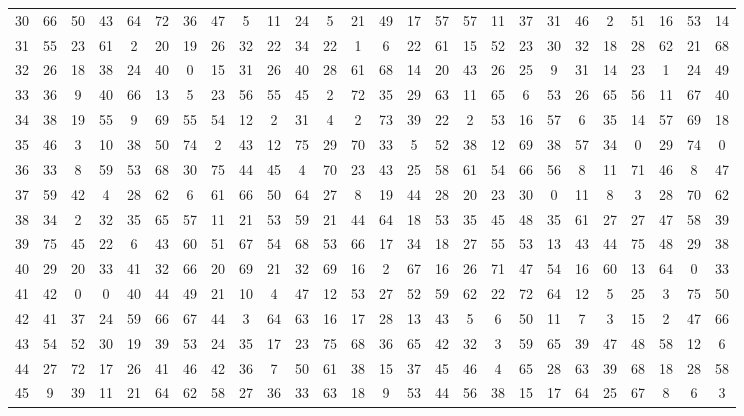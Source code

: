 \begin{table}
\begin{tabular}{c c c c c c c c c c c c c c c c c c c c c c c c c c }
30 & 66 & 50 & 43 & 64 & 72 & 36 & 47 & 5 & 11 & 24 & 5 & 21 & 49 & 17 & 57 & 57 & 11 & 37 & 31 & 46 & 2 & 51 & 16 & 53 & 14 \\
31 & 55 & 23 & 61 & 2 & 20 & 19 & 26 & 32 & 22 & 34 & 22 & 1 & 6 & 22 & 61 & 15 & 52 & 23 & 30 & 32 & 18 & 28 & 62 & 21 & 68 \\
32 & 26 & 18 & 38 & 24 & 40 & 0 & 15 & 31 & 26 & 40 & 28 & 61 & 68 & 14 & 20 & 43 & 26 & 25 & 9 & 31 & 14 & 23 & 1 & 24 & 49 \\
33 & 36 & 9 & 40 & 66 & 13 & 5 & 23 & 56 & 55 & 45 & 2 & 72 & 35 & 29 & 63 & 11 & 65 & 6 & 53 & 26 & 65 & 56 & 11 & 67 & 40 \\
34 & 38 & 19 & 55 & 9 & 69 & 55 & 54 & 12 & 2 & 31 & 4 & 2 & 73 & 39 & 22 & 2 & 53 & 16 & 57 & 6 & 35 & 14 & 57 & 69 & 18 \\
35 & 46 & 3 & 10 & 38 & 50 & 74 & 2 & 43 & 12 & 75 & 29 & 70 & 33 & 5 & 52 & 38 & 12 & 69 & 38 & 57 & 34 & 0 & 29 & 74 & 0 \\
36 & 33 & 8 & 59 & 53 & 68 & 30 & 75 & 44 & 45 & 4 & 70 & 23 & 43 & 25 & 58 & 61 & 54 & 66 & 56 & 8 & 11 & 71 & 46 & 8 & 47 \\
37 & 59 & 42 & 4 & 28 & 62 & 6 & 61 & 66 & 50 & 64 & 27 & 8 & 19 & 44 & 28 & 20 & 23 & 30 & 0 & 11 & 8 & 3 & 28 & 70 & 62 \\
38 & 34 & 2 & 32 & 35 & 65 & 57 & 11 & 21 & 53 & 59 & 21 & 44 & 64 & 18 & 53 & 35 & 45 & 48 & 35 & 61 & 27 & 27 & 47 & 58 & 39 \\
39 & 75 & 45 & 22 & 6 & 43 & 60 & 51 & 67 & 54 & 68 & 53 & 66 & 17 & 34 & 18 & 27 & 55 & 53 & 13 & 43 & 44 & 75 & 48 & 29 & 38 \\
40 & 29 & 20 & 33 & 41 & 32 & 66 & 20 & 69 & 21 & 32 & 69 & 16 & 2 & 67 & 16 & 26 & 71 & 47 & 54 & 16 & 60 & 13 & 64 & 0 & 33 \\
41 & 42 & 0 & 0 & 40 & 44 & 49 & 21 & 10 & 4 & 47 & 12 & 53 & 27 & 52 & 59 & 62 & 22 & 72 & 64 & 12 & 5 & 25 & 3 & 75 & 50 \\
42 & 41 & 37 & 24 & 59 & 66 & 67 & 44 & 3 & 64 & 63 & 16 & 17 & 28 & 13 & 43 & 5 & 6 & 50 & 11 & 7 & 3 & 15 & 2 & 47 & 66 \\
43 & 54 & 52 & 30 & 19 & 39 & 53 & 24 & 35 & 17 & 23 & 75 & 68 & 36 & 65 & 42 & 32 & 3 & 59 & 65 & 39 & 47 & 48 & 58 & 12 & 6 \\
44 & 27 & 72 & 17 & 26 & 41 & 46 & 42 & 36 & 7 & 50 & 61 & 38 & 15 & 37 & 45 & 46 & 4 & 65 & 28 & 63 & 39 & 68 & 18 & 28 & 58 \\
45 & 9 & 39 & 11 & 21 & 64 & 62 & 58 & 27 & 36 & 33 & 63 & 18 & 9 & 53 & 44 & 56 & 38 & 15 & 17 & 64 & 25 & 67 & 8 & 6 & 3 \\

\end{tabular}
\end{table}
